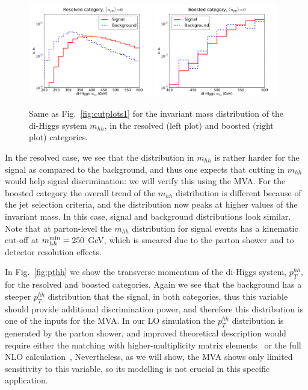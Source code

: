 \begin{figure}[t]
\begin{center}
  \includegraphics[width=0.48\textwidth]{plots/m_HH_C2_res_noPU.pdf}
  \includegraphics[width=0.48\textwidth]{plots/m_HH_C2_bst_noPU.pdf}
  \caption{\small
Same as   Fig.~\ref{fig:cutplots1} for the invariant
mass distribution of the di-Higgs system $m_{hh}$, in
the resolved (left plot) and boosted (right plot) categories.
}
\label{fig:mhh}
\end{center}
\end{figure}

In the resolved case, we see that the distribution
in $m_{hh}$ is rather harder for the signal as compared
to the background,
and thus one expects that cutting in $m_{hh}$ would help signal
discrimination: we will verify this using the MVA.
%
For the boosted category the overall trend of the $m_{hh}$ distribution
is different because of the jet selection criteria, and the
distribution now peaks at higher values of the invariant mass.
%
In this case, signal and background distributions
look similar.
%
Note that at parton-level the $m_{hh}$ distribution
for signal events has a kinematic
cut-off at $m_{hh}^{\rm min}=250$ GeV, which is smeared due
to 
the parton shower and to detector resolution effects.
%


In Fig.~\ref{fig:pthh} we show the transverse momentum of
the di-Higgs system, $p_T^{hh}$,
for the resolved and boosted categories.
%
Again we see that the background has a steeper $p_T^{hh}$ distribution
that the signal, in both categories, thus this variable
should provide additional discrimination power, and therefore
this distribution is one of the inputs for the MVA.
%
In our LO simulation the $p_T^{hh}$ distribution is generated
by the parton shower, and improved theoretical
description would require
either the matching with higher-multiplicity
matrix elements~\cite{Maierhofer:2013sha} or
the full NLO calculation~\cite{Frederix:2014hta},
%
Nevertheless, as we will show,
the MVA shows only limited sensitivity to this variable, so its
modelling is not crucial in this specific application.

